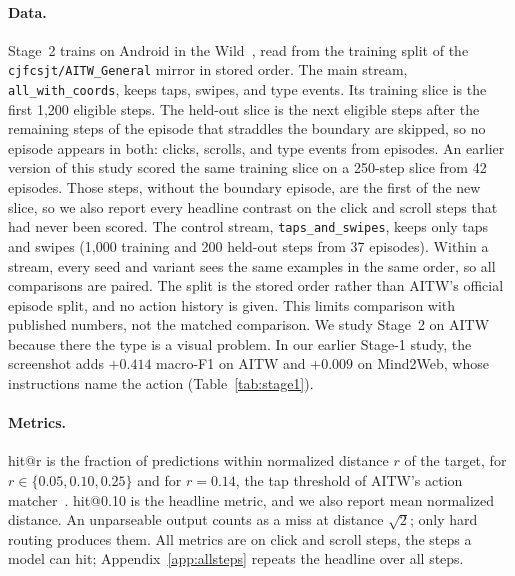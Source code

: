 \documentclass[letterpaper]{article} %
\makeatletter
\newcommand{\hitat}[1]{hit@#1}
\newcommand{\mix}[1]{\texttt{#1}}
\makeatother
\begin{document}
\paragraph{Data.}
Stage~2 trains on Android in the Wild~\citep{aitw}, read from the training split of the \texttt{cjfcsjt/AITW\_General} mirror in stored order. The main stream, \mix{all\_with\_coords}, keeps taps, swipes, and type events. Its training slice is the first 1,200 eligible steps. The held-out slice is the next \nSliceN{} eligible steps after the remaining steps of the episode that straddles the boundary are skipped, so no episode appears in both: \nSliceClick{} clicks, \nSliceScroll{} scrolls, and \nSliceType{} type events from \nSliceEps{} episodes. An earlier version of this study scored the same training slice on a 250-step slice from 42 episodes. Those steps, without the boundary episode, are the first \nSliceOverlap{} of the new slice, so we also report every headline contrast on the \nSliceFresh{} click and scroll steps that had never been scored. The control stream, \mix{taps\_and\_swipes}, keeps only taps and swipes (1,000 training and 200 held-out steps from 37 episodes). Within a stream, every seed and variant sees the same examples in the same order, so all comparisons are paired. The split is the stored order rather than AITW's official episode split, and no action history is given. This limits comparison with published numbers, not the matched comparison. We study Stage~2 on AITW because there the type is a visual problem. In our earlier Stage-1 study, the screenshot adds $+0.414$ macro-F1 on AITW and $+0.009$ on Mind2Web, whose instructions name the action (Table~\ref{tab:stage1}).

\paragraph{Metrics.}
\hitat{r} is the fraction of predictions within normalized distance $r$ of the target, for $r \in \{0.05, 0.10, 0.25\}$ and for $r = 0.14$, the tap threshold of AITW's action matcher~\citep{aitw}. \hitat{0.10} is the headline metric, and we also report mean normalized distance. An unparseable output counts as a miss at distance $\sqrt{2}$; only hard routing produces them. All metrics are on click and scroll steps, the \nSliceSpatial{} steps a model can hit; Appendix~\ref{app:allsteps} repeats the headline over all steps.
\end{document}

